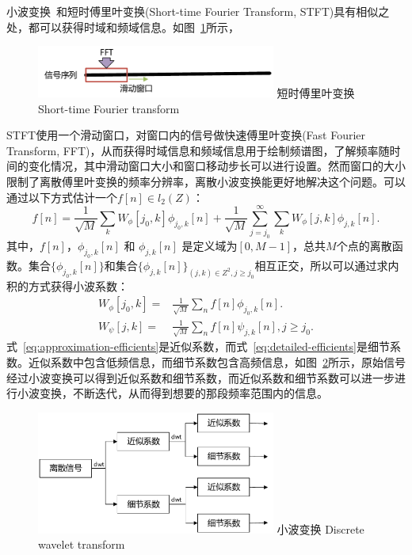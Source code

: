 小波变换~\cite{chun2010tutorial}和短时傅里叶变换(Short-time Fourier Transform, STFT)具有相似之处，都可以获得时域和频域信息。如图~\ref{fig:stft}所示，
\begin{figure}[!htp]
  \centering
  \includegraphics[width=0.7\textwidth]{figure/stft.pdf}
  \bicaption
    {短时傅里叶变换}
    {Short-time Fourier transform}
  \label{fig:stft}
\end{figure}
STFT使用一个滑动窗口，对窗口内的信号做快速傅里叶变换(Fast Fourier Transform, FFT)，从而获得时域信息和频域信息用于绘制频谱图，了解频率随时间的变化情况，其中滑动窗口大小和窗口移动步长可以进行设置。然而窗口的大小限制了离散傅里叶变换的频率分辨率，离散小波变换能更好地解决这个问题。可以通过以下方式估计一个$f[n] \in l_{2}(Z)$：
\begin{equation}
f[n] = \frac{1}{\sqrt{M}}\sum_{k} W_{\phi}[j_{0},k]\phi_{j_{0},k}[n] + \frac{1}{\sqrt{M}}\sum_{j=j_{0}}^{\infty}\sum_{k}W_{\phi}[j,k]\phi_{j,k}[n].
\end{equation}
其中，$f[n]$，$\phi_{j_{0},k}[n]$ 和 $\phi_{j,k}[n]$ 是定义域为$[0,M-1]$，总共$M$个点的离散函数。集合$\{\phi_{j_{0},k}[n]\}$和集合$\{\phi_{j,k}[n]\}_{(j,k)\in Z^{2}, j \geq j_{0}}$相互正交，所以可以通过求内积的方式获得小波系数：
\begin{align}
W_{\phi}[j_{0},k]=&\frac{1}{\sqrt{M}}\sum_{n}f[n]\phi_{j_{0},k}[n]. \label{eq:approximation-efficients} \\
W_{\psi}[j,k] =& \frac{1}{\sqrt{M}}\sum_{n}f[n]\psi_{j,k}[n],  j \geq j_{0}. \label{eq:detailed-efficients}
\end{align}
式~\ref{eq:approximation-efficients}是近似系数，而式~\ref{eq:detailed-efficients}是细节系数。近似系数中包含低频信息，而细节系数包含高频信息，如图~\ref{fig:dwt}所示，原始信号经过小波变换可以得到近似系数和细节系数，而近似系数和细节系数可以进一步进行小波变换，不断迭代，从而得到想要的那段频率范围内的信息。
\begin{figure}[!htp]
  \centering
  \includegraphics[width=0.7\textwidth]{figure/dwt.pdf}
  \bicaption
    {小波变换}
    {Discrete wavelet transform}
  \label{fig:dwt}
\end{figure}

